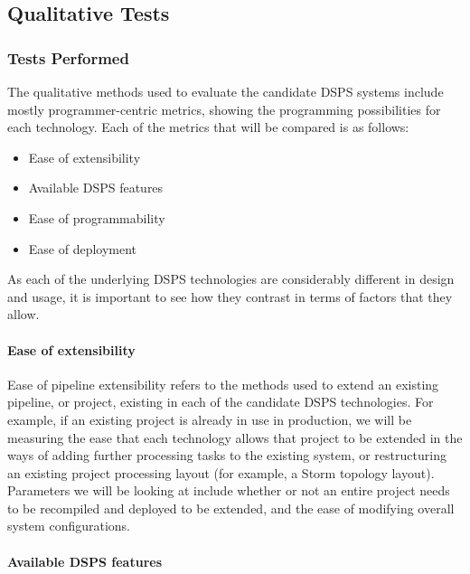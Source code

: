 


\subsection{Qualitative Tests} %
\label{sub:qualitative_tests}

\subsubsection{Tests Performed} %
\label{ssub:tests_performed}

The qualitative methods used to evaluate the candidate DSPS systems include mostly programmer-centric metrics, showing the
programming possibilities for each technology. Each of the metrics that will be compared is as follows:

\begin{itemize}
  \item Ease of extensibility
  \item Available DSPS features
  \item Ease of programmability
  \item Ease of deployment
\end{itemize}

As each of the underlying DSPS technologies are considerably different in design and usage, it is important to see how
they contrast in terms of factors that they allow.

\paragraph{Ease of extensibility}

Ease of pipeline extensibility refers to the methods used to extend an existing pipeline, or project, existing in each
of the candidate DSPS technologies. For example, if an existing project is already in use in production, we will be measuring the
ease that each technology allows that project to be extended in the ways of adding further processing tasks to the
existing system, or restructuring an existing project processing layout (for example, a Storm topology layout). Parameters
we will be looking at include whether or not an entire project needs to be recompiled and deployed to be extended, and the
ease of modifying overall system configurations.

\paragraph{Available DSPS features}

